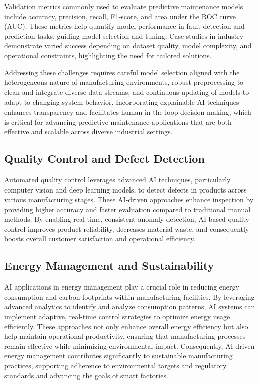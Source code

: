\documentclass[sigconf]{acmart}
\begin{document}
Validation metrics commonly used to evaluate predictive maintenance models include accuracy, precision, recall, F1-score, and area under the ROC curve (AUC). These metrics help quantify model performance in fault detection and prediction tasks, guiding model selection and tuning. Case studies in industry demonstrate varied success depending on dataset quality, model complexity, and operational constraints, highlighting the need for tailored solutions.

Addressing these challenges requires careful model selection aligned with the heterogeneous nature of manufacturing environments, robust preprocessing to clean and integrate diverse data streams, and continuous updating of models to adapt to changing system behavior. Incorporating explainable AI techniques enhances transparency and facilitates human-in-the-loop decision-making, which is critical for advancing predictive maintenance applications that are both effective and scalable across diverse industrial settings.

\subsection{Quality Control and Defect Detection}
Automated quality control leverages advanced AI techniques, particularly computer vision and deep learning models, to detect defects in products across various manufacturing stages. These AI-driven approaches enhance inspection by providing higher accuracy and faster evaluation compared to traditional manual methods. By enabling real-time, consistent anomaly detection, AI-based quality control improves product reliability, decreases material waste, and consequently boosts overall customer satisfaction and operational efficiency.

\subsection{Energy Management and Sustainability}
AI applications in energy management play a crucial role in reducing energy consumption and carbon footprints within manufacturing facilities. By leveraging advanced analytics to identify and analyze consumption patterns, AI systems can implement adaptive, real-time control strategies to optimize energy usage efficiently. These approaches not only enhance overall energy efficiency but also help maintain operational productivity, ensuring that manufacturing processes remain effective while minimizing environmental impact. Consequently, AI-driven energy management contributes significantly to sustainable manufacturing practices, supporting adherence to environmental targets and regulatory standards and advancing the goals of smart factories.
\end{document}
